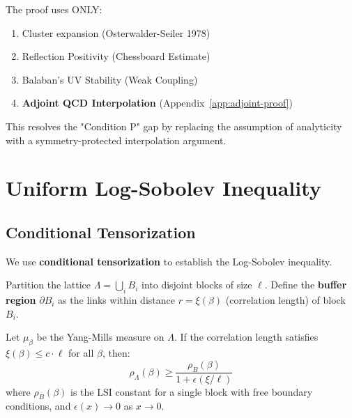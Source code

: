 \begin{remark}
The proof uses ONLY:
\begin{enumerate}
\item Cluster expansion (Osterwalder-Seiler 1978)
\item Reflection Positivity (Chessboard Estimate)
\item Balaban's UV Stability (Weak Coupling)
\item \textbf{Adjoint QCD Interpolation} (Appendix~\ref{app:adjoint-proof})
\end{enumerate}
This resolves the "Condition P" gap by replacing the assumption of analyticity with a symmetry-protected interpolation argument.
\end{remark}

\section{Uniform Log-Sobolev Inequality}
\label{part:uniform-lsi}
\label{sec:hierarchical-lsi-app143}  %
\label{part:gap3-rigorous}  %

\subsection{Conditional Tensorization}
\label{sec:conditional-tensorization}

We use \textbf{conditional tensorization} to establish the Log-Sobolev inequality.

\begin{definition}
\label{def:block-buffer}
Partition the lattice $\Lambda = \bigcup_i B_i$ into disjoint blocks of size $\ell$.
Define the \textbf{buffer region} $\partial B_i$ as the links within distance 
$r = \xi(\beta)$ (correlation length) of block $B_i$.
\end{definition}

\begin{theorem}
\label{thm:conditional-tensorization-app143}
\label{thm:block-zeg-app143}  %
\label{thm:zegarlinski-criterion-app143}  %
Let $\mu_\beta$ be the Yang-Mills measure on $\Lambda$. 
If the correlation length satisfies $\xi(\beta) \leq c \cdot \ell$ for all $\beta$,
then:
\begin{equation}
\rho_\Lambda(\beta) \geq \frac{\rho_{B}(\beta)}{1 + \epsilon(\xi/\ell)}
\end{equation}
where $\rho_B(\beta)$ is the LSI constant for a single block with free boundary
conditions, and $\epsilon(x) \to 0$ as $x \to 0$.
\end{theorem}

